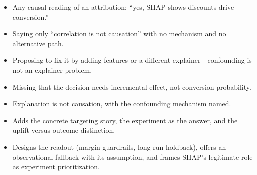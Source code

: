 \begin{interviewq}
\redflags
\begin{itemize}
    \item Any causal reading of an attribution: ``yes, SHAP shows discounts drive conversion.''
    \item Saying only ``correlation is not causation'' with no mechanism and no alternative path.
    \item Proposing to fix it by adding features or a different explainer---confounding is not an explainer problem.
    \item Missing that the decision needs incremental effect, not conversion probability.
\end{itemize}


\goodgreat
\begin{itemize}
    \item {} Explanation is not causation, with the confounding mechanism named.
    \item {} Adds the concrete targeting story, the experiment as the answer, and the uplift-versus-outcome distinction.
    \item {} Designs the readout (margin guardrails, long-run holdback), offers an observational fallback with its assumption, and frames SHAP's legitimate role as experiment prioritization.
\end{itemize}

\end{interviewq}


